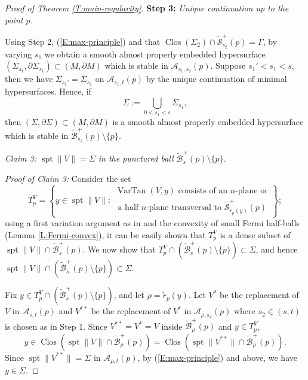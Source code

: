 \documentclass[10pt]{amsart}
\theoremstyle{definition}
\theoremstyle{remark}
\numberwithin{equation}{section}
\newcommand{\A}{\mathcal{A}}
\newcommand{\Si}{\Sigma}
\newcommand{\tBcal}{\widetilde{\mathcal{B}}}
\newcommand{\tScal}{\widetilde{\mathcal{S}}}
\newcommand{\tir}{\widetilde{r}}
\newcommand{\VarTan}{\operatorname{VarTan}}
\newcommand{\spt}{\operatorname{spt}}
\newcommand{\Clos}{\operatorname{Clos}}
\begin{document}
\begin{proof}[Proof of Theorem \ref{T:main-regularity}]
\vspace{.3cm}

\noindent \textbf{Step 3:} \textit{Unique continuation up to the point $p$.}

\vspace{.3cm}

Using Step 2, (\ref{E:max-principle}) and that $\Clos(\Si_2) \cap \tScal^+_{s_2}(p)=\Gamma$, by varying $s_1$ we obtain a smooth almost properly embedded hypersurface $(\Sigma_{s_1},\partial \Sigma_{s_1}) \subset (M,\partial M)$ which is stable in $\A_{s_1,s_2}(p)$. Suppose $s_1'<s_1<s$, then we have $\Sigma_{s_1'}=\Sigma_{s_1}$ on $\A_{s_1,t}(p)$ by the unique continuation of minimal hypersurfaces. Hence, if
\[ \Sigma:=\bigcup_{0<s_1<s} \Sigma_{s_1},\]
then $(\Sigma,\partial \Sigma) \subset (M,\partial M)$ is a smooth almost properly embedded hypersurface which is stable in $\tBcal^+_{s_2}(p) \setminus \{p\}$. 


\vspace{0.3cm}

\textit{Claim 3: $\spt \|V\|=\Sigma$ in the punctured ball $\tBcal^+_s(p) \setminus \{p\}$.}

\vspace{0.3cm}

\textit{Proof of Claim 3:} Consider the set
\[ T^V_p=\left\{ y \in \spt\|V\| : \begin{array}{l}
\VarTan(V, y) \text{ consists of an $n$-plane or}\\
\text{ a half $n$-plane transversal to } \tScal^+_{\tir_p(y)}(p)
\end{array} \right\};\]
using a first variation argument as in \cite[Lemma B.2]{Colding-deLellis03} and the convexity of small Fermi half-balls (Lemma \ref{L:Fermi-convex}), it can be easily shown that $T^V_p$ is a dense subset of $\spt \|V\|\cap \tBcal^+_s(p)$. We now show that $T^V_p \cap (\tBcal^+_s(p) \setminus \{p\}) \subset\Sigma$, and hence $\spt\|V\|\cap (\tBcal^+_s(p) \setminus \{p\})\subset\Sigma$. 

Fix $y \in T^V_p \cap (\tBcal^+_s(p) \setminus \{p\})$, and let $\rho=\tir_p(y)$. Let $V^*$ be the replacement of $V$ in $\A_{s,t}(p)$ and $V^{**}$ be the replacement of $V^*$ in $\A_{\rho,s_2}(p)$ where $s_2 \in (s,t)$ is chosen as in Step 1. Since $V^{**}=V^*=V$ inside $\tBcal^+_\rho(p)$ and $y \in T^V_p$, 
\[ y  \in \Clos(\spt\|V\|\cap \tBcal^+_\rho(p))=\Clos(\spt\|V^{**}\|\cap \tBcal^+_\rho(p)).\]
Since $\spt \|V^{**}\|= \Sigma$ in $\A_{\rho,t}(p)$, by (\ref{E:max-principle}) and above, we have $y \in \Sigma$. 


\end{proof}
\end{document}
